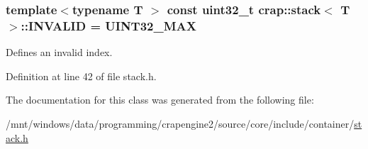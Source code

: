 \subsubsection[{I\+N\+V\+A\+L\+I\+D}]{\setlength{\rightskip}{0pt plus 5cm}template$<$typename T $>$ const uint32\+\_\+t {\bf crap\+::stack}$<$ T $>$\+::I\+N\+V\+A\+L\+I\+D = {\bf U\+I\+N\+T32\+\_\+\+M\+A\+X}\hspace{0.3cm}{\ttfamily [static]}}\label{classcrap_1_1stack_a35cffde292cd6f37a07a5dc5fceed1bf}


Defines an invalid index. 



Definition at line 42 of file stack.\+h.



The documentation for this class was generated from the following file\+:\begin{DoxyCompactItemize}
\item 
/mnt/windows/data/programming/crapengine2/source/core/include/container/\hyperlink{stack_8h}{stack.\+h}\end{DoxyCompactItemize}

